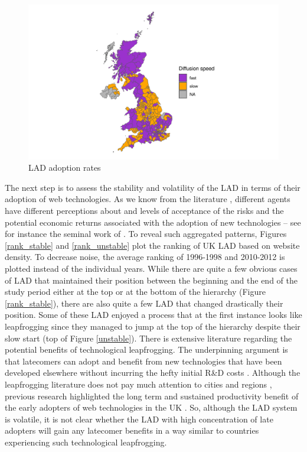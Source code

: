 \documentclass[
  authoryear,
  preprint,
  3p]{elsarticle}
\begin{document}
\begin{figure}[H]

{\centering \includegraphics[width=1\textwidth,height=\textheight]{../../outputs/s/speed_map.png}

}

\caption{\label{s_map}LAD adoption rates}

\end{figure}%

The next step is to assess the stability and volatility of the LAD in
terms of their adoption of web technologies. As we know from the
literature \citep{risk_perceptions}, different agents have different
perceptions about and levels of acceptance of the risks and the
potential economic returns associated with the adoption of new
technologies -- see for instance the seminal work of
\citet{venkatesh2000theoretical}. To reveal such aggregated patterns,
Figures \ref{rank_stable} and \ref{rank_unstable} plot the ranking of UK
LAD based on website density. To decrease noise, the average ranking of
1996-1998 and 2010-2012 is plotted instead of the individual years.
While there are quite a few obvious cases of LAD that maintained their
position between the beginning and the end of the study period either at
the top or at the bottom of the hierarchy (Figure \ref{rank_stable}),
there are also quite a few LAD that changed drastically their position.
Some of these LAD enjoyed a process that at the first instance looks
like leapfrogging since they managed to jump at the top of the hierarchy
despite their slow start (top of Figure \ref{unstable}). There is
extensive literature regarding the potential benefits of technological
leapfrogging. The underpinning argument is that latecomers can adopt and
benefit from new technologies that have been developed elsewhere without
incurring the hefty initial R\&D costs \citep{teece2008firm}. Although
the leapfrogging literature does not pay much attention to cities and
regions \citep{yu2018sustainability}, previous research highlighted the
long term and sustained productivity benefit of the early adopters of
web technologies in the UK \citep{tranosuk}. So, although the LAD system
is volatile, it is not clear whether the LAD with high concentration of
late adopters will gain any latecomer benefits in a way similar to
countries experiencing such technological leapfrogging.
\end{document}

